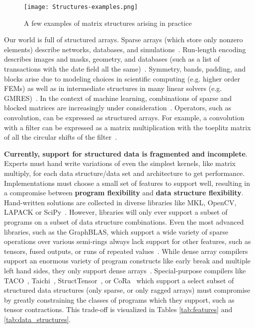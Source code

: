 \begin{figure}
	\texttt{[image: Structures-examples.png]}
    \vspace{-12pt}
    \caption{A few examples of matrix structures arising in practice}
    \vspace{-8pt}
\end{figure}
Our world is full of structured arrays.
%
Sparse arrays (which store only nonzero elements) describe networks, databases, and simulations~\cite{abhyankarpetsc, bell2007lessons, mcauley2013hidden, balay2020petsc}.
%
Run-length encoding describes images and masks, geometry, and
databases (such as a list of transactions with the date field all the same)~\cite{shi2020column,golomb1966run}.
%
Symmetry, bands, padding, and blocks arise due to modeling choices in scientific computing (e.g. higher order FEMs) as well as in intermediate structures in many linear solvers (e.g. GMRES)~\cite{ded, saad2003iterative, o2009scientific}.
%
In the context of machine learning, combinations of sparse and blocked matrices are increasingly under consideration~\cite{dao2022monarch}.
%
Operators, such as convolution, can be expressed as structured arrays.
%
For example, a convolution with a filter can be expressed as a matrix multiplication
with the toeplitz matrix of all the circular shifts of the filter~\cite{sze2017efficient}.

%
\textbf{Currently, support for structured data is fragmented and incomplete}.
%
Experts must hand write variations of even the simplest kernels, like matrix
multiply, for each data structure/data set and architecture to get performance.
%
Implementations must choose a small set of features to support well, resulting
in a compromise between \textbf{program flexibility} and \textbf{data structure
flexibility}.
%
Hand-written solutions are collected in diverse libraries like
MKL, OpenCV, LAPACK or SciPy~\cite{ bradski2000opencv, anderson1999lapack, virtanen2020scipy, psarras2022linear}. 
%
However, libraries will only ever support a subset of
programs on a subset of data structure combinations.
%
Even the most advanced
libraries, such as the GraphBLAS, which support a wide variety of sparse
operations over various semi-rings always lack support for other features, such
as tensors, fused outputs, or runs of repeated values~\cite{bulucc2017design, mattson2019lagraph}.
%
While dense array
compilers support an enormous variety of program constructs like early break and
multiple left hand sides, they only support dense arrays~\cite{ragan-kelley_halide_2013,grosser2012polly}.  
%
Special-purpose
compilers like TACO~\cite{kjolstad_tensor_2019}, Taichi~\cite{hu_taichi_2019}, StructTensor~\cite{ghorbani2023compiling}, or CoRa~\cite{fegade_cora_2022} which support a select subset of structured data
structures (only sparse, or only ragged arrays) must compromise by greatly
constraining the classes of programs which they support, such as tensor
contractions.
%
This trade-off is visualized in Tables \ref{tab:features} and \ref{tab:data_structures}.
%

